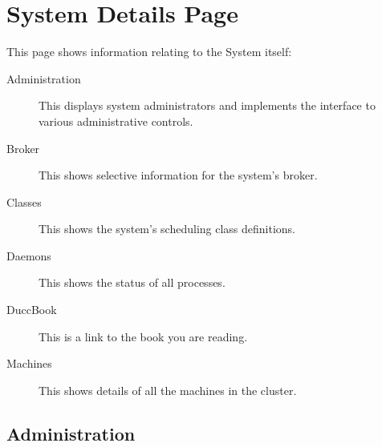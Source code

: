 % 
% 
% 
% 

\section{System  Details Page}
\label{sec:system-details}

This page shows information relating to the {\DUCC} System itself:
\begin{description}
  \item[Administration]This displays system administrators and implements
    the interface to various administrative controls.
  \item[Broker] This shows selective information for the system's broker.
  \item[Classes] This shows the system's scheduling class definitions.
  \item[Daemons] This shows the status of all {\DUCC} processes.
  \item[DuccBook] This is a link to the book you are reading.
  \item[Machines] This shows details of all the machines in the {\DUCC} cluster.
\end{description}

\subsection{Administration}

